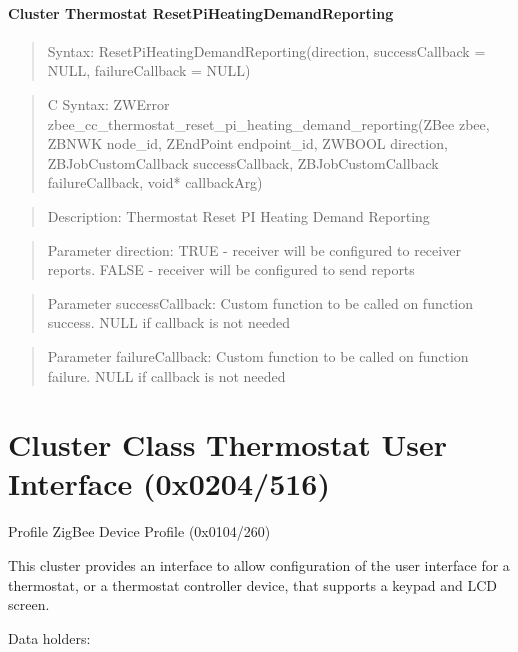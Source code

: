 \paragraph{Cluster Thermostat ResetPiHeatingDemandReporting}
\begin{quote}Syntax: ResetPiHeatingDemandReporting(direction, successCallback = NULL, failureCallback = NULL)\end{quote}
\begin{quote}C Syntax: ZWError zbee\_cc\_thermostat\_reset\_pi\_heating\_demand\_reporting(ZBee zbee, ZBNWK node\_id, ZEndPoint endpoint\_id, ZWBOOL direction, ZBJobCustomCallback successCallback, ZBJobCustomCallback failureCallback, void* callbackArg)\end{quote}
\begin{quote}Description: Thermostat Reset PI Heating Demand Reporting\end{quote}
\begin{quote}Parameter direction: TRUE  - receiver will be configured to receiver reports. FALSE - receiver will be configured to send reports\end{quote}
\begin{quote}Parameter successCallback: Custom function to be called on function success. NULL if callback is not needed\end{quote}
\begin{quote}Parameter failureCallback: Custom function to be called on function failure. NULL if callback is not needed\end{quote}



\section{Cluster Class Thermostat User Interface (0x0204/516)}

Profile ZigBee Device Profile (0x0104/260)

This cluster provides an interface to allow configuration of the user interface for a thermostat, or a thermostat controller device, that supports a keypad and LCD screen.
\newline

\noindent
Data holders:

